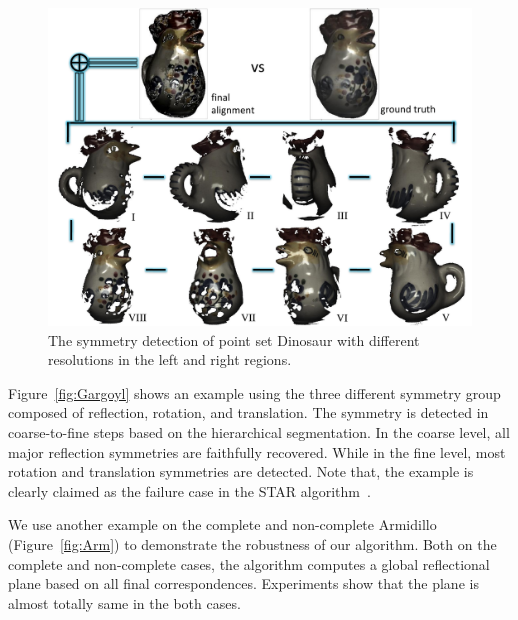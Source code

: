 \begin{figure}[t]
\centering
  \includegraphics[width=0.99\linewidth]{figures/Rooster.pdf}
  \caption{The symmetry detection of point set Dinosaur with different resolutions in the left and right regions.}
\label{fig:Point}
\end{figure}

Figure~\ref{fig:Gargoyl} shows an example using the three different symmetry group composed of reflection, rotation, and translation.
The symmetry is detected in coarse-to-fine steps based on the hierarchical segmentation.
In the coarse level, all major reflection symmetries are faithfully recovered.
While in the fine level, most rotation and translation symmetries are detected.
Note that, the example is clearly claimed as the failure case in the STAR algorithm~\cite{berner2011}.

We use another example on the complete and non-complete Armidillo (Figure~\ref{fig:Arm}) to demonstrate the robustness of our algorithm.
Both on the complete and non-complete cases, the algorithm computes a global reflectional plane based on all final correspondences. 
Experiments show that the plane is almost totally same in the both cases.

